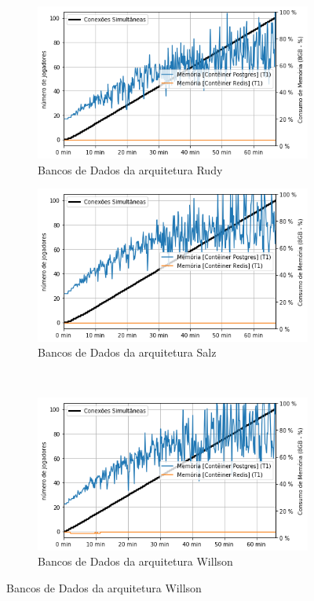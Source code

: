 \begin{figure}[htb!]
    \caption{Consumo de memória dos bancos de dados}
    \label{fig:experimento_db_mem}

    \begin{subfigure}{0.5\textwidth}
        \centering
        \includegraphics[width=.95\linewidth]{figuras/testes/r_mem_db.png}
        \caption{Bancos de Dados da arquitetura Rudy}
        \label{fig:r_mem_db}
    \end{subfigure}%
    \begin{subfigure}{0.5\textwidth}
        \centering
        \includegraphics[width=.95\linewidth]{figuras/testes/s_mem_db.png}
        \caption{Bancos de Dados da arquitetura Salz}
        \label{fig:s_mem_db}
    \end{subfigure}\\

    \begin{subfigure}{0.5\textwidth}
        \centering
        \includegraphics[width=.95\linewidth]{figuras/testes/w_mem_db.png}
        \caption{Bancos de Dados da arquitetura Willson}
        \label{fig:w_mem_db}
    \end{subfigure}


\end{figure}
